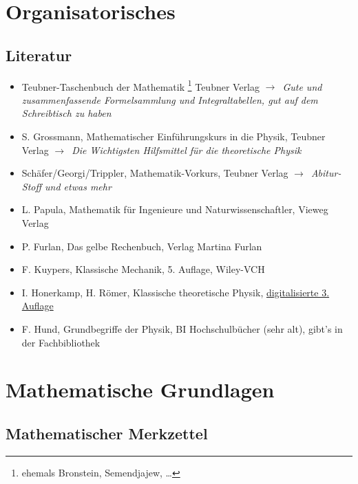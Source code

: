 \documentclass[oneside]{book}
\theoremstyle{definition}
\newcommand{\conseq}{$\rightarrow$~}
\begin{document}
\chapter{Organisatorisches}

\section{Literatur}

\begin{itemize}
	\item Teubner-Taschenbuch der Mathematik \footnote{ehemals Bronstein, Semendjajew, \dots} Teubner Verlag \conseq \textit{Gute und zusammenfassende Formelsammlung und Integraltabellen, gut auf dem Schreibtisch zu haben}
	\item S. Grossmann, Mathematischer Einführungskurs in die Physik, Teubner Verlag \conseq \textit{Die Wichtigsten Hilfsmittel für die theoretische Physik}
	\item Schäfer/Georgi/Trippler, Mathematik-Vorkurs, Teubner Verlag \conseq \textit{Abitur-Stoff und etwas mehr}
	\item L. Papula, Mathematik für Ingenieure und Naturwissenschaftler, Vieweg Verlag
	\item P. Furlan, Das gelbe Rechenbuch, Verlag Martina Furlan
	\item F. Kuypers, Klassische Mechanik, 5. Auflage, Wiley-VCH
	\item I. Honerkamp, H. Römer, Klassische theoretische Physik, \href{http://www.freidok.uni-freiburg.de/volltexte/82/}{digitalisierte 3. Auflage}
	\item F. Hund, Grundbegriffe der Physik, BI Hochschulbücher (sehr alt), gibt's in der Fachbibliothek
\end{itemize}

\chapter{Mathematische Grundlagen}

\section{Mathematischer Merkzettel}
\end{document}
